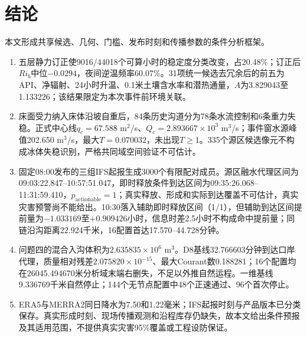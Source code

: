 \section{结论}
本文形成共享候选、几何、门槛、发布时刻和传播参数的条件分析框架。
\begin{enumerate}
\item 五层静力订正使9016/44018个可算小时的稳定度分类改变，占20.48\%；订正后$Ri_b$中位$-0.0294$，夜间逆温频率60.07\%。31项统一候选去冗余后的前五为API、净辐射、24小时升温、0.1米土壤含水率和潜热通量，$A$为3.829043至1.133226；该结果限定为本次事件前环境关联。
\item 床面受力纳入床体沿坡自重后，84条历史沟道分为78条水流控制和6条重力失稳。正式中心线$q_c=67.588$ m$^2$/s、$Q_c=2.893667\times10^3$ m$^3$/s；事件窗水源峰值202.650 m$^3$/s，最大$T=0.070032$，未出现$T\ge1$。335个源区候选像元不构成冰体失稳识别，严格共同域空间验证不可估计。
\item 固定08:00发布的三组IFS起报生成3000个有限配对成员。源区融水代理区间为09:03:22.847--10:57:51.047，即时释放条件到达区间为09:35:26.068--11:31:59.410，$p_{\mathrm{actionable}}=1$；真实释放、形成和实际到达覆盖不可估计，真实灾害预警尚不能给出。10:30落入辅助即时释放区间（1/1），但辅助到达区间提前量为$-1.033169$至$+0.909426$小时，信息时差2.5小时不构成命中提前量；同链沿沟距离22.924千米，16配置首达17.570--44.728分钟。
\item 问题四的混合入沟体积为$2.635835\times10^6$ m$^3$。D8基线32.766603分钟到达口岸代理，质量相对残差$2.075820\times10^{-15}$、最大Courant数0.188281；16个配置均在26045.494670米分析域末端右删失，不足以外推自然运程。一维基线9.336769千米自然停止；144个无节点配置中48个正速通过、96个首次停止。
\item ERA5与MERRA2同日降水为7.50和1.22毫米；IFS起报时刻与产品版本已分类保存。真实形成时刻、现场传播观测和沿程库存仍缺失，故本文给出条件预报及其适用范围，不提供真实灾害95\%覆盖或工程设防保证。
\end{enumerate}
